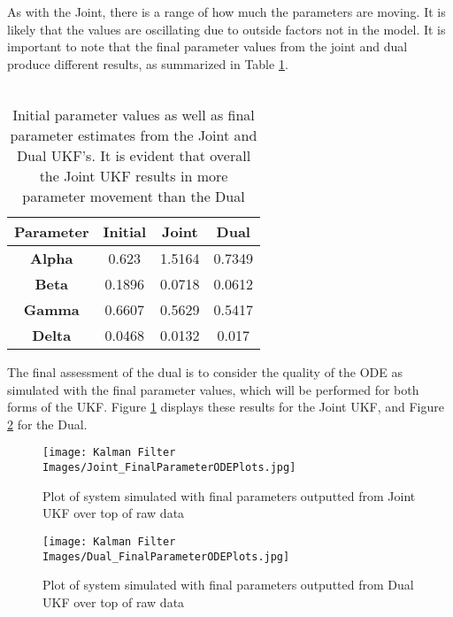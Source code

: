 \documentclass{article}
\begin{document}
As with the Joint, there is a range of how much the parameters are moving. It is likely that the values are oscillating due to outside factors not in the model. It is important to note that the final parameter values from the joint and dual produce different results, as summarized in Table \ref{table:LV_ParamValues}.\\
\\
\begin{table}[H]
  \begin{center}
    \label{tab:table1}
    \begin{tabular}{c|c|c|c} %
      \textbf{Parameter} & \textbf{Initial} & \textbf{Joint} & \textbf{Dual} \\
      \hline
      \textbf{Alpha} & 0.623 & 1.5164 & 0.7349\\
      \textbf{Beta} & 0.1896 & 0.0718 & 0.0612\\
      \textbf{Gamma} & 0.6607 & 0.5629 & 0.5417\\
      \textbf{Delta} & 0.0468 & 0.0132 & 0.017
    \end{tabular}
    \caption{Initial parameter values as well as final parameter estimates from the Joint and Dual UKF's. It is evident that overall the Joint UKF results in more parameter movement than the Dual}
    \label{table:LV_ParamValues}
  \end{center}
\end{table}
The final assessment of the dual is to consider the quality of the ODE as simulated with the final parameter values, which will be performed for both forms of the UKF. Figure \ref{fig:LV_Joint_ODESims} displays these results for the Joint UKF, and Figure \ref{fig:LV_Dual_ODESims} for the Dual. \\

\begin{figure}[H]
    \centering
    \texttt{[image: Kalman Filter Images/Joint\_FinalParameterODEPlots.jpg]}
    \caption{Plot of system simulated with final parameters outputted from Joint UKF over top of raw data}
    \label{fig:LV_Joint_ODESims}
\end{figure}

\begin{figure}[H]
    \centering
    \texttt{[image: Kalman Filter Images/Dual\_FinalParameterODEPlots.jpg]}
    \caption{Plot of system simulated with final parameters outputted from Dual UKF over top of raw data}
    \label{fig:LV_Dual_ODESims}
\end{figure}
\end{document}
